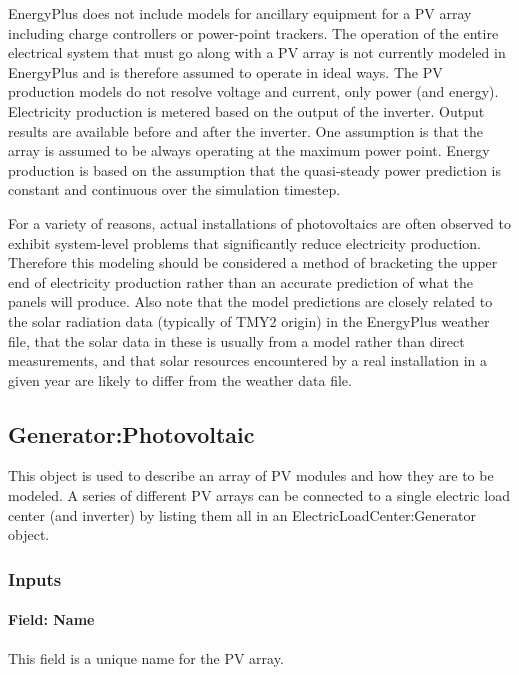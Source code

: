 EnergyPlus does not include models for ancillary equipment for a PV array including charge controllers or power-point trackers. The operation of the entire electrical system that must go along with a PV array is not currently modeled in EnergyPlus and is therefore assumed to operate in ideal ways. The PV production models do not resolve voltage and current, only power (and energy). Electricity production is metered based on the output of the inverter. Output results are available before and after the inverter. One assumption is that the array is assumed to be always operating at the maximum power point. Energy production is based on the assumption that the quasi-steady power prediction is constant and continuous over the simulation timestep.

For a variety of reasons, actual installations of photovoltaics are often observed to exhibit system-level problems that significantly reduce electricity production. Therefore this modeling should be considered a method of bracketing the upper end of electricity production rather than an accurate prediction of what the panels will produce. Also note that the model predictions are closely related to the solar radiation data (typically of TMY2 origin) in the EnergyPlus weather file, that the solar data in these is usually from a model rather than direct measurements, and that solar resources encountered by a real installation in a given year are likely to differ from the weather data file.

\subsection{Generator:Photovoltaic}\label{generatorphotovoltaic-000}

This object is used to describe an array of PV modules and how they are to be modeled. A series of different PV arrays can be connected to a single electric load center (and inverter) by listing them all in an ElectricLoadCenter:Generator object.

\subsubsection{Inputs}\label{inputs-20-000}

\paragraph{Field: Name}\label{field-name-23}

This field is a unique name for the PV array.

